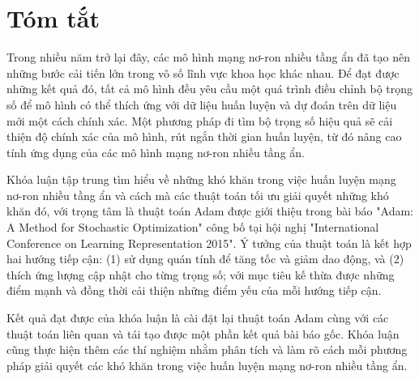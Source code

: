 \chapter*{Tóm tắt}
\label{summary}

Trong nhiều năm trở lại đây, các mô hình mạng nơ-ron nhiều tầng ẩn đã tạo nên những bước cải tiến lớn trong vô số lĩnh vực khoa học khác nhau. Để đạt được những kết quả đó, tất cả mô hình đều yêu cầu một quá trình điều chỉnh bộ trọng số để mô hình có thể thích ứng với dữ liệu huấn luyện và dự đoán trên dữ liệu mới một cách chính xác. Một phương pháp đi tìm bộ trọng số hiệu quả sẽ cải thiện độ chính xác của mô hình, rút ngắn thời gian huấn luyện, từ đó nâng cao tính ứng dụng của các mô hình mạng nơ-ron nhiều tầng ẩn. 

Khóa luận tập trung tìm hiểu về những khó khăn trong việc huấn luyện mạng nơ-ron nhiều tầng ẩn và cách mà các thuật toán tối ưu giải quyết những khó khăn đó, với trọng tâm là thuật toán Adam được giới thiệu trong bài báo "Adam: A Method for Stochastic Optimization" công bố tại hội nghị "International Conference on Learning Representation 2015". Ý tưởng của thuật toán là kết hợp hai hướng tiếp cận: (1) sử dụng quán tính để tăng tốc và giảm dao động, và (2) thích ứng lượng cập nhật cho từng trọng số; với mục tiêu kế thừa được những điểm mạnh và đồng thời cải thiện những điểm yếu của mỗi hướng tiếp cận. 

Kết quả đạt được của khóa luận là cài đặt lại thuật toán Adam cùng với các thuật toán liên quan và tái tạo được một phần kết quả bài báo gốc. Khóa luận cũng thực hiện thêm các thí nghiệm nhằm phân tích và làm rõ cách mỗi phương pháp giải quyết các khó khăn trong việc huấn luyện mạng nơ-ron nhiều tầng ẩn.